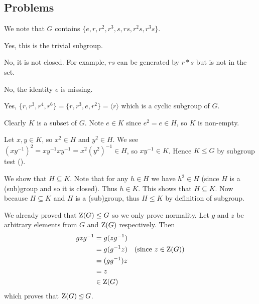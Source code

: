 \subsection*{Problems}
\begin{questions}
    \item We note that $G$ contains $\{e, r, r^2, r^3, s, rs, r^2s, r^3s\}$.
    \begin{partquestions}{\alph*}
        \item Yes, this is the trivial subgroup.
        \item No, it is not closed. For example, $rs$ can be generated by $r \ast s$ but is not in the set.
        \item No, the identity $e$ is missing.
        \item Yes, $\{r, r^3, r^4, r^6\} = \{r, r^3, e, r^2\} = \langle r \rangle$ which is a cyclic subgroup of $G$.
    \end{partquestions}

    \item \begin{partquestions}{\alph*}
        \item Clearly $K$ is a subset of $G$. Note $e \in K$ since $e^2 = e \in H$, so $K$ is non-empty.

        Let $x, y \in K$, so $x^2 \in H$ and $y^2 \in H$. We see $(xy^{-1})^2 = xy^{-1}xy^{-1} = x^2\left(y^2\right)^{-1} \in H$, so $xy^{-1} \in K$. Hence $K \leq G$ by subgroup test ().

        \item We show that $H \subseteq K$. Note that for any $h \in H$ we have $h^2 \in H$ (since $H$ is a (sub)group and so it is closed). Thus $h \in K$. This shows that $H \subseteq K$. Now because $H \subseteq K$ and $H$ is a (sub)group, thus $H \leq K$ by definition of subgroup.
    \end{partquestions}

    \item \begin{partquestions}{\alph*}
        \item We already proved that $\mathrm{Z}(G) \leq G$ so we only prove normality. Let $g$ and $z$ be arbitrary elements from $G$ and $\mathrm{Z}(G)$ respectively. Then
        \begin{align*}
            gzg^{-1} &= g(zg^{-1})\\
            &= g(g^{-1}z) & (\text{since }z \in \mathrm{Z}(G))\\
            &= (gg^{-1})z \\
            &= z\\
            &\in \mathrm{Z}(G)
        \end{align*}
        which proves that $\mathrm{Z}(G) \unlhd G$.


\end{partquestions}
\end{questions}
